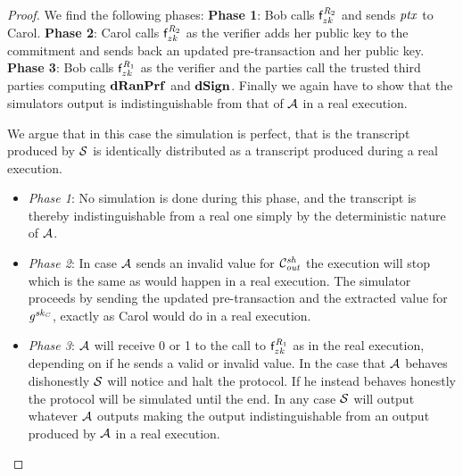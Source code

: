 \begin{proof}
    We find the following phases:
    \textbf{Phase 1}: Bob calls $\mathsf{f}^{\mathit{R}_2}_{zk}$ and sends $\mathit{ptx}$ to Carol.
    \textbf{Phase 2}: Carol calls $\mathsf{f}^{\mathit{R}_2}_{zk}$ as the verifier adds her public key to the commitment and sends back an updated pre-transaction and her public key.
    \textbf{Phase 3}: Bob calls $\mathsf{f}^{\mathit{R}_1}_{zk}$ as the verifier and the parties call the trusted third parties computing $\mathbf{dRanPrf}$ and $\mathbf{dSign}$.
    Finally we again have to show that the simulators output is indistinguishable from that of $\mathcal{A}$ in a real execution.

    We argue that in this case the simulation is perfect, that is the transcript produced by $\mathcal{S}$ is identically distributed as a transcript produced during a real execution.
    \begin{itemize}
        \item \textit{Phase 1}: No simulation is done during this phase, and the transcript is thereby indistinguishable from a real one simply by the deterministic nature of $\mathcal{A}$.
        \item \textit{Phase 2}: In case $\mathcal{A}$ sends an invalid value for $\mathcal{C}_{\mathit{out}}^{\mathit{sh}}$ the execution will stop which is the same as would happen in a real execution.
        The simulator proceeds by sending the updated pre-transaction and the extracted value for $\mathit{g}^{\mathit{sk}_{\mathit{C}}}$, exactly as Carol would do in a real execution.
        \item \textit{Phase 3}: $\mathcal{A}$ will receive 0 or 1 to the call to $\mathsf{f}^{\mathit{R}_1}_{zk}$ as in the real execution, depending on if he sends a valid or invalid value.
        In the case that $\mathcal{A}$ behaves dishonestly $\mathcal{S}$ will notice and halt the protocol.
        If he instead behaves honestly the protocol will be simulated until the end.
        In any case $\mathcal{S}$ will output whatever $\mathcal{A}$ outputs making the output indistinguishable from an output produced by $\mathcal{A}$ in a real execution.
    \end{itemize}


\end{proof}
